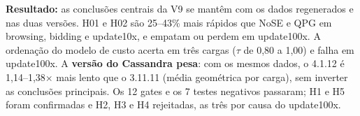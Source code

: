 \textbf{Resultado:} as conclusões centrais da V9 se mantêm com os dados regenerados e nas duas versões. H01 e H02 são 25--43\% mais rápidos que NoSE e QPG em browsing, bidding e update10x, e empatam ou perdem em update100x. A ordenação do modelo de custo acerta em três cargas ($\tau$ de 0,80 a 1,00) e falha em update100x. A \textbf{versão do Cassandra pesa}: com os mesmos dados, o 4.1.12 é 1,14--1,38$\times$ mais lento que o 3.11.11 (média geométrica por carga), sem inverter as conclusões principais. Os 12 gates e os 7 testes negativos passaram; H1 e H5 foram confirmadas e H2, H3 e H4 rejeitadas, as três por causa do update100x.
